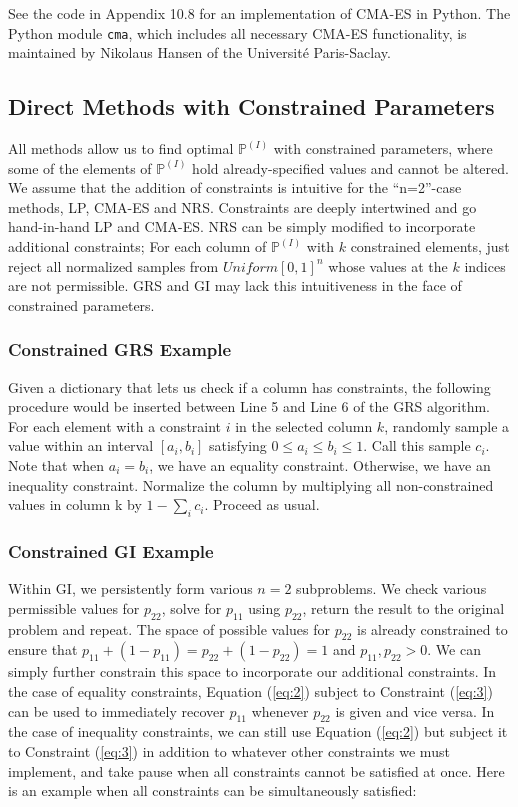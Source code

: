 \documentclass{article}
\begin{document}
See the code in Appendix 10.8 for an implementation of CMA-ES in Python. The Python module \texttt{cma}, which includes all necessary CMA-ES functionality, is maintained by Nikolaus Hansen of the Universit\'e Paris-Saclay. \cite{cma1} \cite{cma2} \cite{cma3} \cite{cma4}

\subsection{Direct Methods with Constrained Parameters}
All methods allow us to find optimal $\mathbb{P}^{(I)}$ with constrained parameters, where some of the elements of $\mathbb{P}^{(I)}$ hold already-specified values and cannot be altered. We assume that the addition of constraints is intuitive for the ``n=2''-case methods, LP, CMA-ES and NRS. Constraints are deeply intertwined and go hand-in-hand LP and CMA-ES. NRS can be simply modified to incorporate additional constraints; For each column of $\mathbb{P}^{(I)}$ with $k$ constrained elements, just reject all normalized samples from $Uniform[0,1]^n$ whose values at the $k$ indices are not permissible. GRS and GI may lack this intuitiveness in the face of constrained parameters.

\subsubsection{Constrained GRS Example}
Given a dictionary that lets us check if a column has constraints, the following procedure would be inserted between Line 5 and Line 6 of the GRS algorithm. For each element with a constraint $i$ in the selected column $k$, randomly sample a value within an interval $[a_i,b_i]$ satisfying $0 \leq a_i \leq b_i \leq 1$. Call this sample $c_i$. Note that when $a_i=b_i$, we have an equality constraint. Otherwise, we have an inequality constraint. Normalize the column by multiplying all non-constrained values in column k by $1-\sum_i c_i$. Proceed as usual.

\subsubsection{Constrained GI Example}
Within GI, we persistently form various $n=2$ subproblems. We check various permissible values for $p_{22}$, solve for $p_{11}$ using $p_{22}$, return the result to the original problem and repeat. The space of possible values for $p_{22}$ is already constrained to ensure that $p_{11} + (1-p_{11}) = p_{22} + (1-p_{22}) = 1$ and $p_{11}, p_{22} > 0$. We can simply further constrain this space to incorporate our additional constraints. In the case of equality constraints, Equation (\ref{eq:2}) subject to Constraint (\ref{eq:3}) can be used to immediately recover $p_{11}$ whenever $p_{22}$ is given and vice versa. In the case of inequality constraints, we can still use Equation (\ref{eq:2}) but subject it to Constraint (\ref{eq:3}) in addition to whatever other constraints we must implement, and take pause when all constraints cannot be satisfied at once. Here is an example when all constraints can be simultaneously satisfied:
\end{document}
